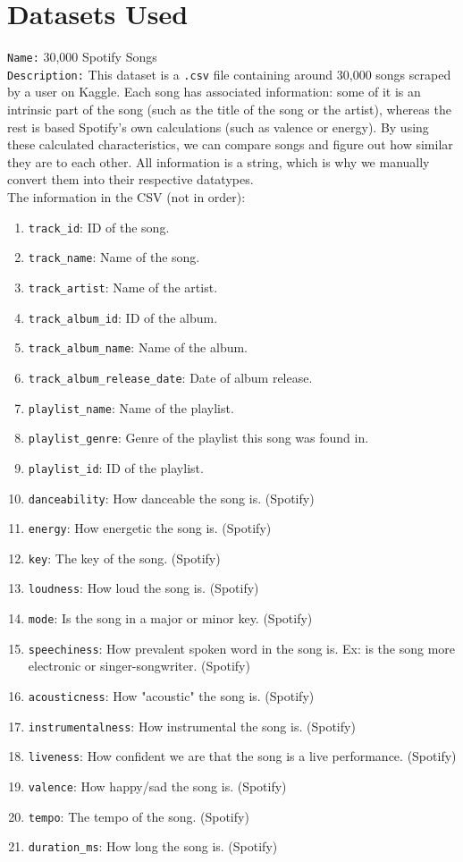 \documentclass[fontsize=11pt]{article}
\begin{document}
\section*{Datasets Used}
\texttt{Name:} 30,000 Spotify Songs\\
\texttt{Description:} This dataset is a \texttt{.csv} file containing around 30,000 songs scraped by a user on Kaggle. Each song has associated information: some of it is an intrinsic part of the song (such as the title of the song or the artist), whereas the rest is based Spotify's own calculations (such as valence or energy). By using these calculated characteristics, we can compare songs and figure out how similar they are to each other. All information is a string, which is why we manually convert them into their respective datatypes.\\
The information in the CSV (not in order):
\begin{enumerate}
    \item \texttt{track\_id}: ID of the song.
    \item \texttt{track\_name}: Name of the song.
    \item \texttt{track\_artist}: Name of the artist.
    \item \texttt{track\_album\_id}: ID of the album.
    \item \texttt{track\_album\_name}: Name of the album.
    \item \texttt{track\_album\_release\_date}: Date of album release.
    \item \texttt{playlist\_name}: Name of the playlist.
    \item \texttt{playlist\_genre}: Genre of the playlist this song was found in.
    \item \texttt{playlist\_id}: ID of the playlist.
    \item \texttt{danceability}: How danceable the song is. (Spotify)
    \item \texttt{energy}: How energetic the song is. (Spotify)
    \item \texttt{key}: The key of the song. (Spotify)
    \item \texttt{loudness}: How loud the song is. (Spotify)
    \item \texttt{mode}: Is the song in a major or minor key. (Spotify)
    \item \texttt{speechiness}: How prevalent spoken word in the song is. Ex: is the song more electronic or singer-songwriter. (Spotify)
    \item \texttt{acousticness}: How "acoustic" the song is. (Spotify)
    \item \texttt{instrumentalness}: How instrumental the song is. (Spotify)
    \item \texttt{liveness}: How confident we are that the song is a live performance. (Spotify)
    \item \texttt{valence}: How happy/sad the song is. (Spotify)
    \item \texttt{tempo}: The tempo of the song. (Spotify)
    \item \texttt{duration\_ms}: How long the song is. (Spotify)
\end{enumerate}\\
\end{document}
